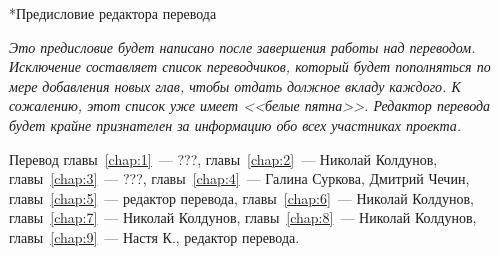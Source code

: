 
\begin{chapter}*{Предисловие редактора перевода}

\textit{Это предисловие будет написано после завершения работы над переводом.
Исключение составляет список переводчиков, который будет пополняться
по мере добавления новых глав, чтобы отдать должное вкладу каждого.
К сожалению, этот список уже имеет <<белые пятна>>. Редактор
перевода будет крайне признателен за информацию обо всех участниках проекта.}

\bigskip 

Перевод главы~\ref{chap:1}~--- ???, главы~\ref{chap:2}~--- Николай Колдунов,
главы~\ref{chap:3}~--- ???, главы~\ref{chap:4}~--- Галина Суркова, 
Дмитрий Чечин, главы~\ref{chap:5}~--- редактор перевода, 
главы~\ref{chap:6}~--- Николай Колдунов, 
главы~\ref{chap:7}~--- Николай Колдунов,
главы~\ref{chap:8}~--- Николай Колдунов,
главы~\ref{chap:9}~--- Настя К., редактор перевода.
\end{chapter}